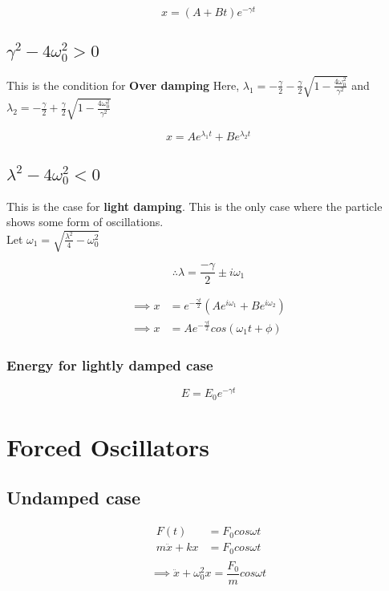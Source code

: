 \documentclass[12pt]{article}
\begin{document}
\begin{equation*}
	x = (A + Bt) e^{-\gamma t}
\end{equation*}

\subsection{ $\gamma^2 -4\omega_0^2 > 0$ }
This is the condition for \textbf{Over damping} 
Here, $\lambda_1 = - \frac{\gamma}{2} - \frac{\gamma}{2} \sqrt{1 - \frac{4 \omega_0^2}{\gamma^2}} $ and $\lambda_2 = - \frac{\gamma}{2} + \frac{\gamma}{2} \sqrt{1 - \frac{4 \omega_0^2}{\gamma^2}} $

\begin{equation*}
	x = A e^{\lambda_1 t} + B e^{\lambda_2 t}
\end{equation*}

\subsection{ $\lambda^2 - 4\omega_0^2 < 0$ }
This is the case for \textbf{light damping}. This is the only case where the particle shows some form of oscillations. \\

Let $\omega_1 = \sqrt{ \frac{\lambda^2}{4} - \omega_0^2 } $

\begin{equation*}
	\therefore \lambda = \frac{-\gamma}{2} \pm i \omega_1
\end{equation*}

\begin{align*}
	\implies x &=  e^{- \frac{\gamma t}{2}} \left( A e^{i\omega_1} + B e^{i\omega_2} \right) \\
	\implies x &=  A e^{- \frac{\gamma t}{2}} cos \left( \omega_1 t + \phi \right)
\end{align*}

\subsubsection{Energy for lightly damped case}
\begin{equation*}
	E = E_0 e^{-\gamma t}
\end{equation*}

\section{Forced Oscillators}

\subsection{Undamped case}
\begin{align*}
	F(t) &=  F_0 cos\omega t \\
	m\ddot{x} + kx &=  F_0 cos\omega t \\
\end{align*}
\begin{equation}
	\label{eqn:FHM}
	\implies \ddot{x} + \omega_0^2x = \frac{F_0}{m} cos \omega t
\end{equation}
\end{document}
